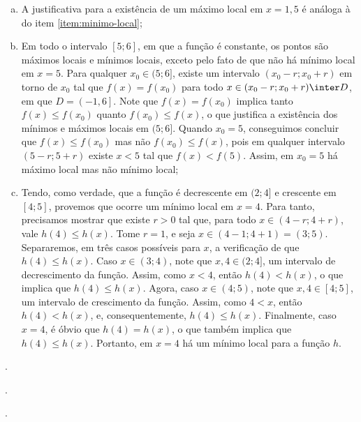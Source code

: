 \begin{solution}
\begin{enumerate}[(a)]
		\item A justificativa para a existência de um máximo local em $x=1{,}5$ é análoga à do item \ref{item:minimo-local};
		\item Em todo o intervalo $[5; 6]$, em que a função é constante, 
		os pontos são máximos locais e mínimos locais, exceto pelo fato de que não há mínimo local em $x=5$. 
		Para qualquer $x_0\in (5;6]$, existe um intervalo $(x_0 - r; x_0+r)$ em torno de $x_0$ tal que $f(x)= f(x_0)$ para todo $x \in (x_0 - r; x_0+r) \inter D$, em que $D = \left(-1,6\right]$.
		Note que $f(x)= f(x_0)$ implica tanto $f(x) \leq f(x_0)$ quanto $f(x_0)\leq f(x)$, 
		o que justifica a existência dos mínimos e máximos locais em $(5;6]$. 
		Quando $x_0=5$, conseguimos concluir que $f(x) \le f(x_0)$ mas não $f(x_0) \le f(x)$, 
		pois em qualquer intervalo $(5 - r; 5+r)$ existe $x < 5$ tal que $f(x) < f(5)$.
		Assim, em $x_0=5$ há máximo local mas não mínimo local;
		\item \label{item:minimo-local-formal} Tendo, como verdade, que a função é decrescente em $(2; 4]$ e crescente em $[4; 5]$, 
		provemos que ocorre um mínimo local em $x=4$. Para tanto, precisamos mostrar que existe $r>0$ tal que, 
		para todo $x \in (4-r; 4+r)$, vale $h(4) \leq h(x)$. 
		Tome $r=1$, e seja $x \in (4-1; 4+1) = (3; 5)$. 
		Separaremos, em três casos possíveis para $x$, a verificação de que $h(4) \leq h(x)$. 
		Caso $x \in (3; 4)$, note que $x, 4 \in (2; 4]$, um intervalo de decrescimento da função. 
		Assim, como $x<4$, então $h(4)< h(x)$, o que implica que $h(4) \leq h(x)$. 
		Agora, caso $x \in (4; 5)$, note que $x, 4 \in [4; 5]$, um intervalo de crescimento da função. 
		Assim, como $4<x$, então $h(4)< h(x)$, e, consequentemente, $h(4)\le h(x)$.
		Finalmente, caso $x=4$, é óbvio que $h(4)=h(x)$, o que também implica que $h(4)\le h(x)$. 
		Portanto, em $x=4$ há um mínimo local para a função $h$.
	\end{enumerate}
\end{solution}

\begin{onlineact}
	.
\end{onlineact}

\begin{onlineact}
	.
\end{onlineact}

\begin{onlineact}
	.
\end{onlineact}